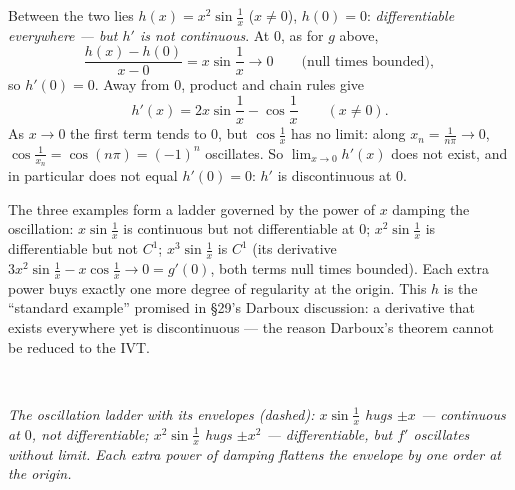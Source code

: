 \documentclass[11pt]{report}
\newcommand{\figcap}[1]{\\[1.5mm]\parbox{0.92\textwidth}{\small\itshape #1}}
\begin{document}
\begin{exbox}
Between the two lies $h(x) = x^2 \sin\tfrac1x$ ($x \neq 0$), $h(0) = 0$: \emph{differentiable everywhere --- but $h'$ is not continuous}. At $0$, as for $g$ above,
\[
\frac{h(x) - h(0)}{x - 0} = x \sin\frac1x \longrightarrow 0 \qquad \text{(null times bounded)},
\]
so $h'(0) = 0$. Away from $0$, product and chain rules give
\[
h'(x) = 2x \sin\frac1x - \cos\frac1x \qquad (x \neq 0).
\]
As $x \to 0$ the first term tends to $0$, but $\cos\tfrac1x$ has no limit: along $x_n = \tfrac{1}{n\pi} \to 0$, $\cos\tfrac{1}{x_n} = \cos(n\pi) = (-1)^n$ oscillates. So $\lim_{x\to0} h'(x)$ does not exist, and in particular does not equal $h'(0) = 0$: $h'$ is discontinuous at $0$.

The three examples form a ladder governed by the power of $x$ damping the oscillation: $x\sin\tfrac1x$ is continuous but not differentiable at $0$; $x^2\sin\tfrac1x$ is differentiable but not $C^1$; $x^3\sin\tfrac1x$ is $C^1$ (its derivative $3x^2\sin\tfrac1x - x\cos\tfrac1x \to 0 = g'(0)$, both terms null times bounded). Each extra power buys exactly one more degree of regularity at the origin. This $h$ is the ``standard example'' promised in \S 29's Darboux discussion: a derivative that exists everywhere yet is discontinuous --- the reason Darboux's theorem cannot be reduced to the IVT.
\end{exbox}

\begin{center}
%
\hfill
{}\figcap{The oscillation ladder with its envelopes (dashed): $x \sin\tfrac1x$ hugs $\pm x$ --- continuous at $0$, not differentiable; $x^2 \sin\tfrac1x$ hugs $\pm x^2$ --- differentiable, but $f'$ oscillates without limit. Each extra power of damping flattens the envelope by one order at the origin.}
\end{center}
\end{document}
